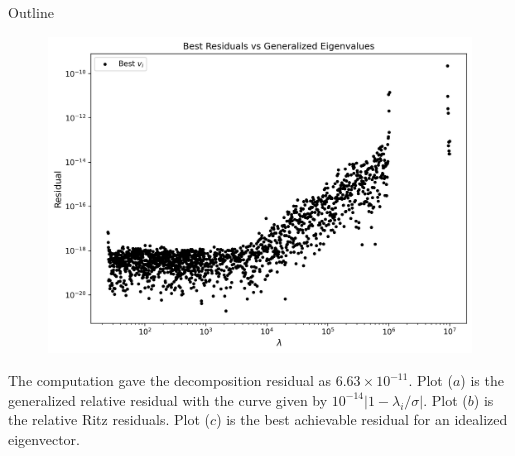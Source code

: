 \documentclass[landscape]{beamer}
\begin{document}
\begin{frame}[allowframebreaks]{Outline}
\begin{figure}
  	\vspace{2ex}  %
  	
  	\centering
  	\includegraphics[scale=.25]{./Plots/LU/residual_lu_bs.png}
  	\subcaption{}
  \end{figure}
 
  
  The computation gave the decomposition residual as $6.63 \times 10^{-11}$. Plot ($a$) is the generalized relative residual with the curve given by
  $10^{-14}|1-\lambda_i/\sigma|$. Plot ($b$) is the relative Ritz residuals. Plot ($c$) is the best achievable residual for an idealized eigenvector.
\end{frame}
\end{document}

